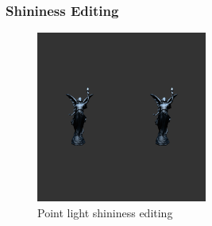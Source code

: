 \documentclass{beamer}
\begin{document}
\begin{frame}
  \frametitle{Shininess Editing}
  \begin{figure}
    \includegraphics[width=0.5\textwidth]{shininess}
    \caption{Point light shininess editing}
  \end{figure}
\end{frame}
\end{document}
